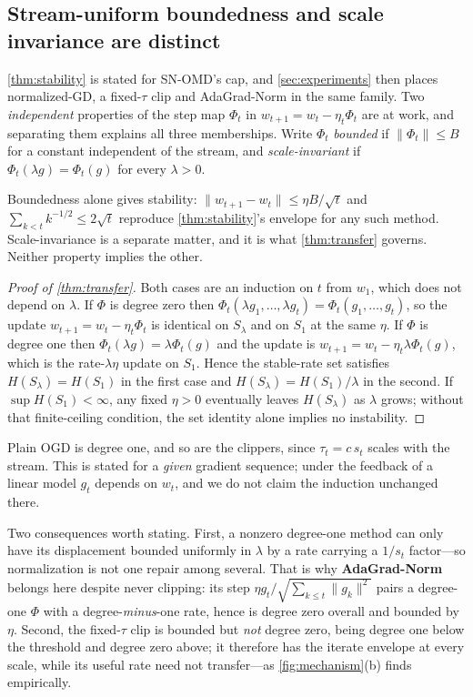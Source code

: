 \documentclass{article}
\newcommand{\norm}[1]{\lVert #1 \rVert}
\newcommand{\gt}{g_t}
\begin{document}
\subsection{Stream-uniform boundedness and scale invariance are distinct}
\label{app:family}
\cref{thm:stability} is stated for SN-OMD's cap, and \cref{sec:experiments} then places
normalized-GD, a fixed-$\tau$ clip and AdaGrad-Norm in the same family. Two \emph{independent}
properties of the step map $\Phi_t$ in $w_{t+1}=w_t-\eta_t\Phi_t$ are at work, and separating
them explains all three memberships. Write $\Phi_t$ \emph{bounded} if $\norm{\Phi_t}\le B$ for a
constant independent of the stream, and \emph{scale-invariant} if $\Phi_t(\lambda g)=\Phi_t(g)$
for every $\lambda>0$.

Boundedness alone gives stability: $\norm{w_{t+1}-w_t}\le\eta B/\sqrt t$ and
$\sum_{k<t}k^{-1/2}\le2\sqrt t$ reproduce \cref{thm:stability}'s envelope for any such method.
Scale-invariance is a separate matter, and it is what \cref{thm:transfer} governs. Neither
property implies the other.

\begin{proof}[Proof of \cref{thm:transfer}]
Both cases are an induction on $t$ from $w_1$, which does not depend on $\lambda$. If $\Phi$ is
degree zero then $\Phi_t(\lambda g_1,\dots,\lambda g_t)=\Phi_t(g_1,\dots,g_t)$, so the update
$w_{t+1}=w_t-\eta_t\Phi_t$ is identical on $S_\lambda$ and on $S_1$ at the same $\eta$. If
$\Phi$ is degree one then $\Phi_t(\lambda g)=\lambda\Phi_t(g)$ and the update is
$w_{t+1}=w_t-\eta_t\lambda\Phi_t(g)$, which is the rate-$\lambda\eta$ update on $S_1$. Hence the
stable-rate set satisfies $H(S_\lambda)=H(S_1)$ in the first case and $H(S_\lambda)=H(S_1)/\lambda$
in the second. If $\sup H(S_1)<\infty$, any fixed $\eta>0$ eventually leaves
$H(S_\lambda)$ as $\lambda$ grows; without that finite-ceiling condition, the set identity
alone implies no instability.
\end{proof}

\noindent Plain OGD is degree one, and so are the clippers, since $\tau_t=c\,s_t$ scales with
the stream. This is stated for a \emph{given} gradient sequence; under the feedback of a linear
model $g_t$ depends on $w_t$, and we do not claim the induction unchanged there.

Two consequences worth stating. First, a nonzero degree-one method can only have its displacement
bounded uniformly in $\lambda$ by a rate carrying a $1/s_t$ factor---so normalization is not one
repair among several. That is why \textbf{AdaGrad-Norm} belongs here despite never clipping: its
step $\eta\gt/\sqrt{\sum_{k\le t}\norm{g_k}^2}$ pairs a degree-one $\Phi$ with a
degree-\emph{minus}-one rate, hence is degree zero overall and bounded by $\eta$. Second, the
fixed-$\tau$ clip is bounded but \emph{not} degree zero, being degree one below the threshold
and degree zero above; it therefore has the iterate envelope at every scale, while its useful
rate need not transfer---as \cref{fig:mechanism}(b) finds empirically.
\end{document}
